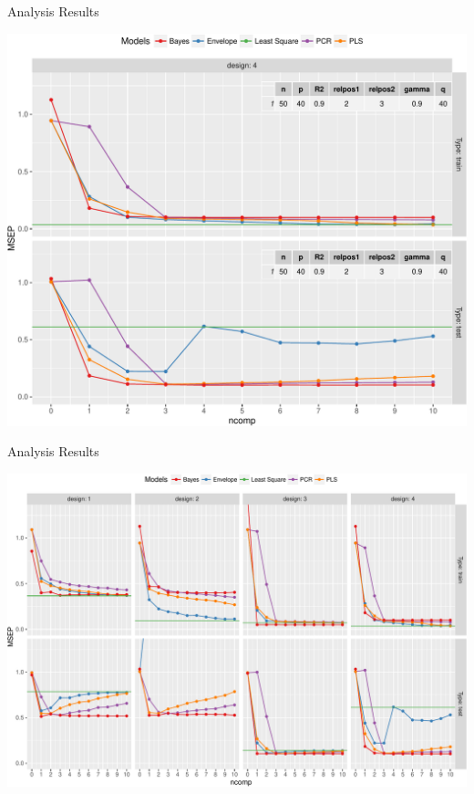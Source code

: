 \documentclass[ignorenonframetext,]{beamer}
\begin{document}
\begin{frame}{Analysis Results}

\begin{center}\includegraphics{Main_files/figure-beamer/unnamed-chunk-9-1} \end{center}

\end{frame}

\begin{frame}{Analysis Results}

\begin{center}\includegraphics{Main_files/figure-beamer/unnamed-chunk-10-1} \end{center}

\end{frame}
\end{document}
